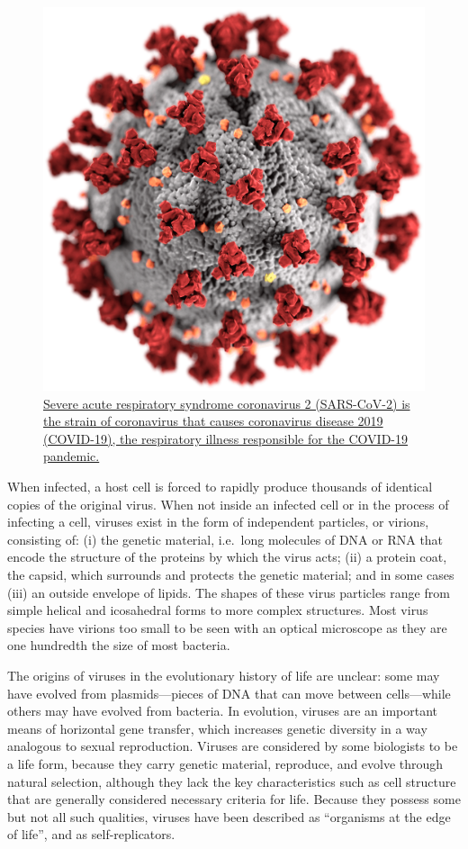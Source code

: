 \begin{figure}

{\centering \includegraphics[width=0.7\linewidth]{./figures/bacteria/SARS-CoV-2_without_background} 

}

\caption{\href{https://commons.wikimedia.org/wiki/File:SARS-CoV-2_without_background.png}{Severe acute respiratory syndrome coronavirus 2 (SARS-CoV-2) is the strain of coronavirus that causes coronavirus disease 2019 (COVID-19), the respiratory illness responsible for the COVID-19 pandemic.}}\label{fig:sarscovi2}
\end{figure}

When infected, a host cell is forced to rapidly produce thousands of identical copies of the original virus. When not inside an infected cell or in the process of infecting a cell, viruses exist in the form of independent particles, or virions, consisting of: (i) the genetic material, i.e.~long molecules of DNA or RNA that encode the structure of the proteins by which the virus acts; (ii) a protein coat, the capsid, which surrounds and protects the genetic material; and in some cases (iii) an outside envelope of lipids. The shapes of these virus particles range from simple helical and icosahedral forms to more complex structures. Most virus species have virions too small to be seen with an optical microscope as they are one hundredth the size of most bacteria.

The origins of viruses in the evolutionary history of life are unclear: some may have evolved from plasmids---pieces of DNA that can move between cells---while others may have evolved from bacteria. In evolution, viruses are an important means of horizontal gene transfer, which increases genetic diversity in a way analogous to sexual reproduction. Viruses are considered by some biologists to be a life form, because they carry genetic material, reproduce, and evolve through natural selection, although they lack the key characteristics such as cell structure that are generally considered necessary criteria for life. Because they possess some but not all such qualities, viruses have been described as ``organisms at the edge of life'', and as self-replicators.

